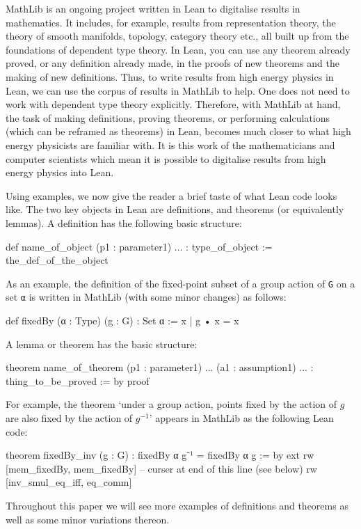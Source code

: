 \documentclass[a4paper, 11pt]{article}
\begin{document}
MathLib is an ongoing project written in Lean to digitalise results in 
mathematics. It includes, for example, results from representation theory, the theory of smooth
manifolds, topology, category theory etc., all built up from the foundations of dependent type
theory. In Lean, you can use any theorem already proved, or any definition already made, in the proofs
of new theorems and the making of new definitions. Thus, to write results from high energy physics
in Lean, we can use the corpus of results in MathLib to help. One does not need to work with dependent type theory explicitly. 
Therefore, with MathLib at hand, the task of making definitions, proving theorems, or performing calculations (which can be reframed as theorems) in Lean, becomes much closer to what high energy physicists are familiar with. It is this work of the mathematicians and computer scientists which mean it is possible to
digitalise results  from high energy physics into Lean.

Using examples, we now give the reader a brief taste of what Lean code looks like. The two key objects in Lean are definitions, and theorems (or equivalently lemmas). A definition
has the following basic structure:
\begin{code}
def name_of_object (p1 : parameter1) ... : type_of_object := the_def_of_the_object
\end{code}
As an example, the definition of the fixed-point subset of a group action of \lstinline|G| on a set \lstinline|α| is written in MathLib (with some minor changes) as follows:
\begin{code}
def fixedBy (α : Type) (g : G) : Set α :=
  { x | g • x = x }
\end{code}

A lemma or theorem has the basic structure:
\begin{code}
 theorem name_of_theorem (p1 : parameter1) ... (a1 : assumption1) ... : 
 		thing_to_be_proved := by
	proof
\end{code}
For example, the theorem `under a group action, points fixed by the action of $g$  are also
 fixed by the action of $g^{-1}$' appears in MathLib as the following Lean code:
\begin{code}
theorem fixedBy_inv (g : G) : fixedBy α g⁻¹ = fixedBy α g := by
  ext
  rw [mem_fixedBy, mem_fixedBy] -- curser at end of this line (see below)
  rw [inv_smul_eq_iff, eq_comm]
\end{code}
Throughout this paper we will see more examples of definitions and theorems as well as some minor variations thereon.
\end{document}
